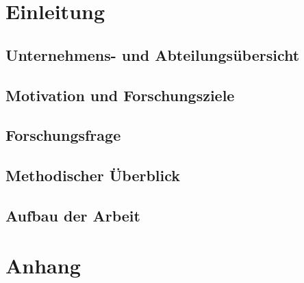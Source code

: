 \documentclass[12pt,a4paper]{article}
\begin{document}







\section{Einleitung}
\subsection{Unternehmens- und Abteilungsübersicht}

\subsection{Motivation und Forschungsziele}
\subsection{Forschungsfrage}
\subsection{Methodischer Überblick}
\subsection{Aufbau der Arbeit}
\newpage

\setcounter{page}{8}


\newpage

\appendix
\section{Anhang}


\newpage
{}

\end{document}
